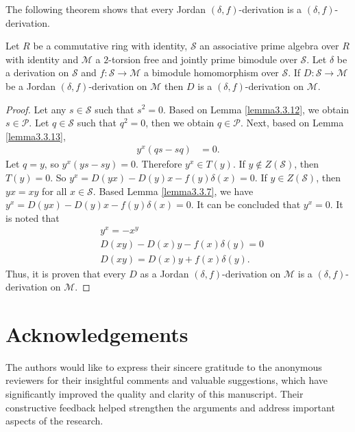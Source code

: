 \documentclass{arxiv}
\begin{document}
The following theorem shows that every Jordan $(\delta,f)$-derivation is a $(\delta,f)$-derivation.
\begin{theorem}\label{teo3.3.2}
    Let $R$ be a commutative ring with identity, $\mathcal{S}$ an associative prime algebra over $R$ with identity and $\mathcal{M}$ a $2$-torsion free and jointly prime bimodule over $\mathcal{S}$. Let $\delta$ be a derivation on $\mathcal{S}$ and $f: \mathcal{S} \rightarrow \mathcal{M}$ a bimodule homomorphism over $\mathcal{S}$. If $D:\mathcal{S} \rightarrow \mathcal{M}$ be a Jordan $(\delta,f)$-derivation on $\mathcal{M}$ then $D$ is a $(\delta,f)$-derivation on $\mathcal{M}$.
\end{theorem}
\begin{proof}
    Let any $s \in \mathcal{S}$ such that $s^2 =0$. Based on Lemma \ref{lemma3.3.12}, we obtain $s \in \mathcal{P}$. Let $q \in \mathcal{S}$ such that $q^2 =0$, then we obtain $q \in \mathcal{P}$. Next, based on Lemma \ref{lemma3.3.13},
    \begin{align*}
        y^x (qs-sq) &= 0.
    \end{align*}
    Let $q=y$, so $y^x(ys-sy)=0$. Therefore $y^x \in T(y)$. If $y \notin Z(\mathcal{S})$, then $T(y)=0$. So $y^x=D(yx)-D(y)x-f(y)\delta(x)=0$. If $y \in Z(\mathcal{S})$, then $yx=xy$ for all $x \in \mathcal{S}$. Based Lemma \ref{lemma3.3.7}, we have $y^x=D(yx)-D(y)x-f(y)\delta(x)=0$. It can be concluded that $y^x =0$. It is noted that
    \begin{align*}
        &y^x = -x^y\\
        &D(xy)-D(x)y-f(x)\delta(y)= 0\\
        &D(xy)=D(x)y+f(x)\delta(y).
    \end{align*}
    Thus, it is proven that every $D$ as a Jordan $(\delta,f)$-derivation on $\mathcal{M}$ is a $(\delta,f)$-derivation on $\mathcal{M}$.
\end{proof}


\section*{Acknowledgements}

The authors would like to express their sincere gratitude to the anonymous reviewers for their insightful comments and valuable suggestions, which have significantly improved the quality and clarity of this manuscript. Their constructive feedback helped strengthen the arguments and address important aspects of the research.
\end{document}
